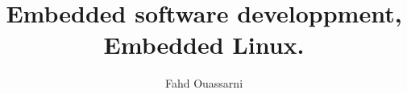 \documentclass{faresume}
\begin{document}

\author{Fahd Ouassarni}
\title{Embedded software developpment,\\ Embedded Linux.}

\address{6 Boulevard Mar\'echal Juin\\
		 14000 CAEN}

\maketitle

\end{document}
